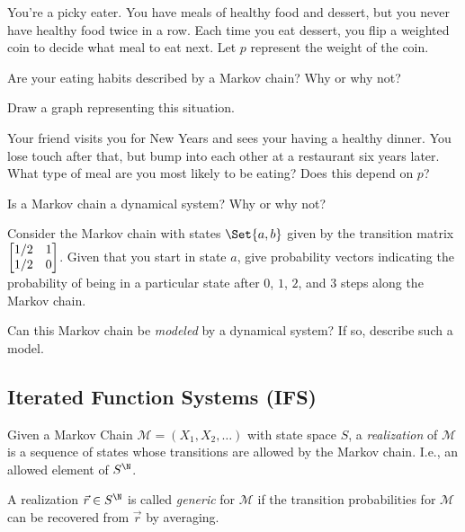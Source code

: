 	\question
	You're a picky eater. You have meals of healthy food and dessert, but you never have healthy food twice in a row.
	Each time you eat dessert, you flip a weighted coin to decide what meal to eat next. Let $p$ represent the weight of
	the coin.
	\begin{parts}
		\item Are your eating habits described by a Markov chain? Why or why not?
		\item Draw a graph representing this situation.
		\item Your friend visits you for New Years and sees your having a healthy dinner. You lose touch
			after that, but bump into each other at a restaurant six years later. What type of meal are
			you most likely to be eating? Does this depend on $p$?
	\end{parts}

	\question
	\begin{parts}
		\item Is a Markov chain a dynamical system? Why or why not?
		\item Consider the Markov chain with states $\Set{a,b}$
			given by the transition matrix $\mat{1/2&1\\1/2&0}$. Given 
			that you start in state $a$, give probability vectors indicating the 
			probability of being in a particular state after $0$, $1$, $2$, and $3$ steps
			along the Markov chain.
		\item Can this Markov chain be \emph{modeled} by a dynamical system? If so, describe
			such a model.
	\end{parts}

	\newpage
	\subsection*{Iterated Function Systems (IFS)}

	\begin{definition}
		Given a Markov Chain $\mathcal M = (X_1,X_2,\ldots)$ with state space $S$, a \emph{realization} 
		of $\mathcal M$ is a sequence of states whose transitions are allowed by the Markov chain. I.e.,
		an allowed element of $S^{\N}$.

		A realization $\vec r\in S^{\N}$ is called \emph{generic} for $\mathcal M$
		if the transition probabilities for $\mathcal M$ can be recovered from $\vec r$ by
		averaging.
	\end{definition}
	
